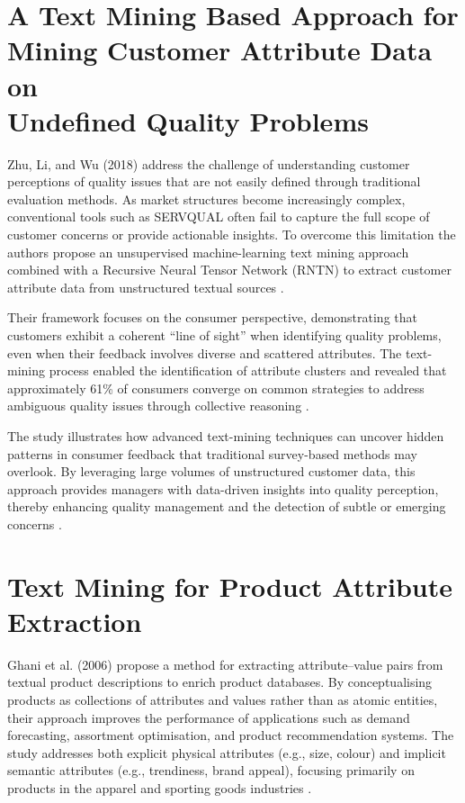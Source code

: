 \documentclass[a4paper, 12pt, twoside]{report}  %
\begin{document}
\section{\texorpdfstring{
    A Text Mining Based Approach for \\ Mining Customer Attribute Data on \\ Undefined Quality Problems
}{
    A Text Mining Based Approach for Mining Customer Attribute Data on Undefined Quality Problems
}}

\indent Zhu, Li, and Wu (2018) address the challenge of understanding customer perceptions of quality issues that are not easily defined through traditional evaluation methods. As market structures become increasingly complex, conventional tools such as SERVQUAL often fail to capture the full scope of customer concerns or provide actionable insights. To overcome this limitation the authors propose an unsupervised machine-learning text mining approach combined with a Recursive Neural Tensor Network (RNTN) to extract customer attribute data from unstructured textual sources \cite{textmining}.

\indent Their framework focuses on the consumer perspective, demonstrating that customers exhibit a coherent “line of sight” when identifying quality problems, even when their feedback involves diverse and scattered attributes. The text-mining process enabled the identification of attribute clusters and revealed that approximately 61\% of consumers converge on common strategies to address ambiguous quality issues through collective reasoning \cite{textmining}.

\indent The study illustrates how advanced text-mining techniques can uncover hidden patterns in consumer feedback that traditional survey-based methods may overlook. By leveraging large volumes of unstructured customer data, this approach provides managers with data-driven insights into quality perception, thereby enhancing quality management and the detection of subtle or emerging concerns \cite{textmining}.

\section{\texorpdfstring{
    Text Mining for Product Attribute \\ Extraction
}{
    Text Mining for Product Attribute Extraction
}}

\indent Ghani et al. (2006) propose a method for extracting attribute–value pairs from textual product descriptions to enrich product databases. By conceptualising products as collections of attributes and values rather than as atomic entities, their approach improves the performance of applications such as demand forecasting, assortment optimisation, and product recommendation systems. The study addresses both explicit physical attributes (e.g., size, colour) and implicit semantic attributes (e.g., trendiness, brand appeal), focusing primarily on products in the apparel and sporting goods industries \cite{ghani}.
\end{document}

